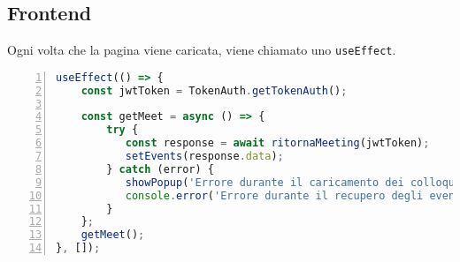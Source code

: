 \subsection{Frontend}
Ogni volta che la pagina viene caricata, viene chiamato uno \texttt{useEffect}.
\begin{lstlisting}[language=typescript, frame=lines, basicstyle=\ttfamily\scriptsize, numbers=left]
useEffect(() => {
    const jwtToken = TokenAuth.getTokenAuth();
    
    const getMeet = async () => {
        try {
           const response = await ritornaMeeting(jwtToken);
           setEvents(response.data);
        } catch (error) {
           showPopup('Errore durante il caricamento dei colloqui', false);
           console.error('Errore durante il recupero degli eventi:', error);
        }
    };  
    getMeet();
}, []);
\end{lstlisting}
